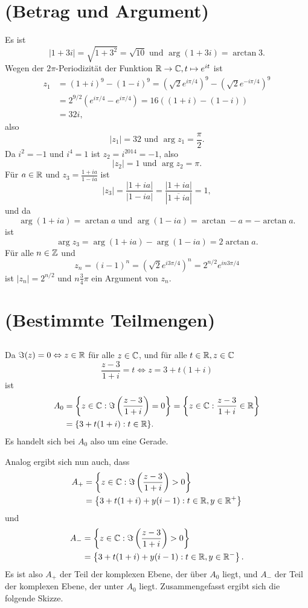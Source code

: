 \documentclass[a4paper,10pt]{article}
\begin{document}
\section{(Betrag und Argument)}
Es ist
\[
 |1+3i| = \sqrt{1+3^2} = \sqrt{10} \text{ und } \arg (1+3i) = \arctan 3.
\]
Wegen der $2\pi$-Periodizität der Funktion $\mathbb{R} \to \mathbb{C}, t \mapsto e^{it}$ ist
\begin{align*}
 z_1
 &= (1+i)^9 - (1-i)^9
 = \left(\sqrt{2}e^{i\pi/4}\right)^9 - \left(\sqrt{2}e^{-i\pi/4}\right)^9 \\
 &= 2^{9/2} (e^{i\pi/4}-e^{i\pi/4})
 = 16 ((1+i)-(1-i)) \\
 &= 32i,
\end{align*}
also
\[
 |z_1| = 32 \text{ und } \arg z_1 = \frac{\pi}{2}.
\]
Da $i^2 = -1$ und $i^4 = 1$ ist $ z_2 = i^{2014} = -1$, also
\[
 |z_2| = 1 \text{ und } \arg z_2 = \pi.
\]
Für $a \in \mathbb{R}$ und $z_3 = \frac{1+ia}{1-ia}$ ist
\[
 \left|z_3\right|
 = \frac{|1+ia|}{|1-ia|}
 = \frac{|1+ia|}{\left|\overline{1+ia}\right|}
 = 1,
\]
und da
\[
 \arg (1+ia) = \arctan a \text{ und } \arg (1-ia) = \arctan -a = - \arctan a.
\]
ist
\[
 \arg z_3 = \arg (1+ia) - \arg (1-ia) = 2 \arctan a.
\]
Für alle $n \in \mathbb{Z}$ und
\[
 z_n = (i-1)^n = \left(\sqrt{2}e^{i3\pi/4}\right)^n = 2^{n/2} e^{in3\pi/4}
\]
ist $|z_n| = 2^{n/2}$ und $n\frac{3}{4}\pi$ ein Argument von $z_n$.





\section{(Bestimmte Teilmengen)}


\subsection{}
Da $\Im(z) = 0 \Leftrightarrow z \in \mathbb{R}$ für alle $z \in \mathbb{C}$, und für alle $t \in \mathbb{R}, z \in \mathbb{C}$
\[
 \frac{z-3}{1+i} = t \Leftrightarrow z = 3+t(1+i)
\]
ist
\begin{align*}
 A_0
 &= \left\{ z \in \mathbb{C} : \Im\left( \frac{z-3}{1+i} \right) = 0 \right\}
 = \left\{ z \in \mathbb{C} : \frac{z-3}{1+i} \in \mathbb{R} \right\} \\
 &= \{ 3+t(1+i) : t \in \mathbb{R} \}.
\end{align*}
Es handelt sich bei $A_0$ also um eine Gerade.

Analog ergibt sich nun auch, dass
\begin{align*}
 A_+
 &= \left\{z \in \mathbb{C} : \Im\left( \frac{z-3}{1+i} \right) > 0 \right\} \\
 &= \left\{3 + t(1+i) + y(i-1) : t \in \mathbb{R}, y \in \mathbb{R}^+\right\}
\end{align*}
und
\begin{align*}
 A_-
 &= \left\{z \in \mathbb{C} : \Im\left( \frac{z-3}{1+i} \right) > 0 \right\} \\
 &= \left\{3 + t(1+i) + y(i-1) : t \in \mathbb{R}, y \in \mathbb{R}^-\right\}.
\end{align*}
Es ist also $A_+$ der Teil der komplexen Ebene, der über $A_0$ liegt, und $A_-$ der Teil der komplexen Ebene, der unter $A_0$ liegt.
Zusammengefasst ergibt sich die folgende Skizze.
\end{document}
